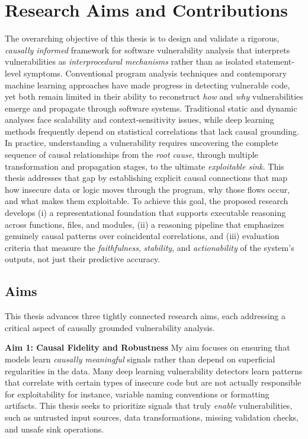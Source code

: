 \documentclass{buthesis}
\begin{document}
\section{Research Aims and Contributions}
\label{sec:intro-aims}

The overarching objective of this thesis is to design and validate a rigorous, \emph{causally informed} framework for software vulnerability analysis that interprets vulnerabilities as \emph{interprocedural mechanisms} rather than as isolated statement-level symptoms. Conventional program analysis techniques and contemporary machine learning approaches have made progress in detecting vulnerable code, yet both remain limited in their ability to reconstruct \emph{how} and \emph{why} vulnerabilities emerge and propagate through software systems. Traditional static and dynamic analyses face scalability and context-sensitivity issues, while deep learning methods frequently depend on statistical correlations that lack causal grounding. In practice, understanding a vulnerability requires uncovering the complete sequence of causal relationships from the \emph{root cause}, through multiple transformation and propagation stages, to the ultimate \emph{exploitable sink}. This thesis addresses that gap by establishing explicit causal connections that map how insecure data or logic moves through the program, why those flows occur, and what makes them exploitable.
To achieve this goal, the proposed research develops (i) a representational foundation that supports executable reasoning across functions, files, and modules, (ii) a reasoning pipeline that emphasizes genuinely causal patterns over coincidental correlations, and (iii) evaluation criteria that measure the \emph{faithfulness}, \emph{stability}, and \emph{actionability} of the system’s outputs, not just their predictive accuracy.

\subsection{Aims}

This thesis advances three tightly connected research aims, each addressing a critical aspect of causally grounded vulnerability analysis.

\textbf{Aim 1: Causal Fidelity and Robustness}
My aim focuses on ensuring that models learn \emph{causally meaningful} signals rather than depend on superficial regularities in the data. Many deep learning vulnerability detectors learn patterns that correlate with certain types of insecure code but are not actually responsible for exploitability for instance, variable naming conventions or formatting artifacts. This thesis seeks to prioritize signals that truly \emph{enable} vulnerabilities, such as untrusted input sources, data transformations, missing validation checks, and unsafe sink operations.
\end{document}
